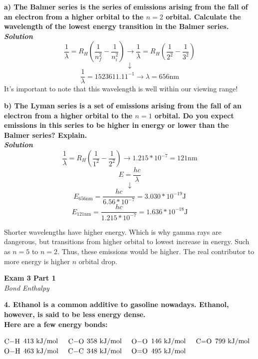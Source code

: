 \documentclass{article}
\begin{document}
    \textbf{a)  The Balmer series is the series of emissions arising from the fall of an electron from a higher orbital to the $n = 2$ orbital. Calculate the wavelength of the lowest energy transition in the Balmer series.}\\
    \textbf{\textit{Solution}}
    $$\dfrac{1}{\lambda} = R_{H}(\dfrac{1}{n^{2}_{f}} - \dfrac{1}{n^{2}_{i}}) \rightarrow \dfrac{1}{\lambda} = R_{H}(\dfrac{1}{2^{2}} - \dfrac{1}{3^{2}})$$
    $$\downarrow$$
    $$\dfrac{1}{\lambda} = 1523611.11^{-1} \rightarrow \lambda = 656 \si{\nano\metre}$$
    It's important to note that this wavelength is well within our viewing range!

    \textbf{b) The Lyman series is a set of emissions arising from the fall of an electron from a higher orbital to the $n = 1$ orbital. Do you expect emissions in this series to be higher in energy or lower than the Balmer series? Explain.}\\
    \textbf{\textit{Solution}}
    $$\dfrac{1}{\lambda} = R_{H}(\dfrac{1}{1^{2}} - \dfrac{1}{2^{2}}) \rightarrow 1.215 * 10^{-7} = 121 \si{\nano\meter}$$
    $$E = \dfrac{hc}{\lambda} $$
    $$ \downarrow $$
    $$E_{656 \si{\nano\meter}} = \dfrac{hc}{6.56 * 10^{-7}}  = 3.030 * 10^{-19} \si{\joule}$$
    $$E_{121 \si{\nano\meter}} = \dfrac{hc}{1.215 * 10^{-7}} = 1.636 * 10^{-18} \si{\joule}$$

    Shorter wavelengths have higher energy. Which is why gamma rays are dangerous, but transitions from higher orbital to lowest increase in energy. Such as $n=5$ to $n=2$. Thus, these emissions would be higher. The real contributor to more energy is higher $n$ orbital drop.

    \pagebreak

    \begin{center}
        \textbf{Exam 3 Part 1}\\
        \textit{Bond Enthalpy}
    \end{center}
    \textbf{4. Ethanol is a common additive to gasoline nowadays. Ethanol, however, is said to be less energy dense.\\ Here are a few energy bonds:}
    \begin{center}
        $\ce{C-H}$ $413 \  \si[per-mode=symbol]{\kilo\joule\per\mol} \quad$
        $\ce{C-O}$ $358 \ \si[per-mode=symbol]{\kilo\joule\per\mol} \quad$
        $\ce{O-O}$ $146 \  \si[per-mode=symbol]{\kilo\joule\per\mol} \quad$
        $\ce{C=O}$ $799 \  \si[per-mode=symbol]{\kilo\joule\per\mol}$\\[.2cm]
        $\ce{O-H}$ $463 \  \si[per-mode=symbol]{\kilo\joule\per\mol} \quad$
        $\ce{C-C}$ $348 \  \si[per-mode=symbol]{\kilo\joule\per\mol} \quad$
        $\ce{O=O}$ $495 \  \si[per-mode=symbol]{\kilo\joule\per\mol}$
    \end{center}
\end{document}
